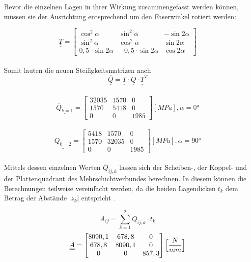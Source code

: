 \noindent Bevor die einzelnen Lagen in ihrer Wirkung zusammengefasst werden können, müssen sie der Ausrichtung entsprechend um den Faserwinkel rotiert werden:

\begin{equation}
	\underline{\underline{T}}=
	\begin{bmatrix}
		\cos^{2}\alpha&\sin^{2}\alpha&-\sin 2\alpha\\
		\sin^{2}\alpha&\cos^{2}\alpha&\sin 2\alpha\\
		0,5\cdot \sin2\alpha&-0,5\cdot\sin2\alpha&\cos 2\alpha
	\end{bmatrix}
\end{equation}\\

\noindent Somit lauten die neuen Steifigkeitsmatrizen nach 
\begin{equation}
	\overline{\underline{\underline{Q}}}=\underline{\underline{T}}\cdot \underline{\underline{Q}} \cdot \underline{\underline{T}}^{T}  
\end{equation}\\

\begin{equation}
\underline{\underline{\overline{Q}_{k=1}}}=
\begin{bmatrix}
	32035 & 1570 & 0\\
	1570 & 5418 & 0\\
	0 & 0 & 1985
\end{bmatrix} [MPa], \alpha = 0°
\end{equation}\\
\begin{equation}
	\underline{\underline{\overline{Q }_{k=2}}}=
	\begin{bmatrix}
		5418 & 1570 & 0\\
		1570 & 32035 & 0\\
		0 & 0 & 1985
	\end{bmatrix} [MPa], \alpha = 90°
\end{equation}\\

\noindent Mittels dessen einzelnen Werten $\overline{Q}_{ij, k}$ lassen sich der Scheiben-, der Koppel- und der Plattenquadrant des Mehrschichtverbundes berechnen. In diesem können die Berechnungen teilweise vereinfacht werden, da die beiden Lagendicken $t_{k}$ dem Betrag der Abstände $|z_{k}|$ entspricht \cite{item3}.

\begin{equation}
	A_{ij}= \sum_{k=1}^{2} \overline{Q}_{ij,k}\cdot t_{k}
\end{equation}
\begin{equation} \underline{\underline{A}}=
	\begin{bmatrix}
		8090,1 & 678,8 & 0\\
		678,8 & 8090,1 & 0\\
		0 & 0 & 857,3\\
	\end{bmatrix} \Bigl[\frac{N}{mm}\Bigr]
\end{equation}


